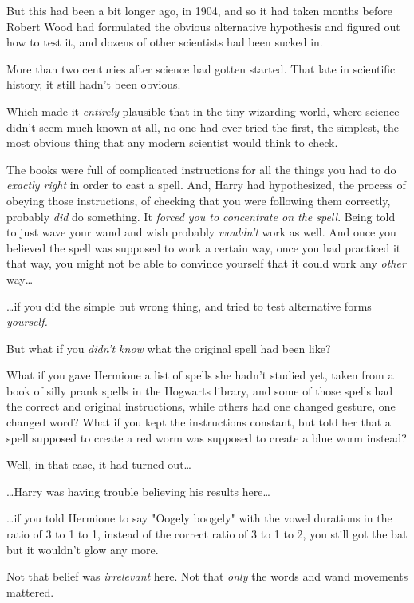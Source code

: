 But this had been a bit longer ago, in 1904, and so it had taken months before
Robert Wood had formulated the obvious alternative hypothesis and figured out
how to test it, and dozens of other scientists had been sucked in.

More than two centuries after science had gotten started. That late in
scientific history, it still hadn't been obvious.

Which made it \emph{entirely} plausible that in the tiny wizarding world, where
science didn't seem much known at all, no one had ever tried the first, the
simplest, the most obvious thing that any modern scientist would think to check.

The books were full of complicated instructions for all the things you had to
do \emph{exactly right} in order to cast a spell. And, Harry had hypothesized,
the process of obeying those instructions, of checking that you were following
them correctly, probably \emph{did} do something. It \emph{forced you to
concentrate on the spell}. Being told to just wave your wand and wish probably
\emph{wouldn't} work as well. And once you believed the spell was supposed to
work a certain way, once you had practiced it that way, you might not be able
to convince yourself that it could work any \emph{other} way{\ldots}

{\ldots}if you did the simple but wrong thing, and tried to test alternative
forms \emph{yourself.}

But what if you \emph{didn't know} what the original spell had been like?

What if you gave Hermione a list of spells she hadn't studied yet, taken from a
book of silly prank spells in the Hogwarts library, and some of those spells
had the correct and original instructions, while others had one changed
gesture, one changed word? What if you kept the instructions constant, but told
her that a spell supposed to create a red worm was supposed to create a blue
worm instead?

Well, in that case, it had turned out{\ldots}

{\ldots}Harry was having trouble believing his results here{\ldots}

{\ldots}if you told Hermione to say "Oogely boogely" with the vowel durations
in the ratio of 3 to 1 to 1, instead of the correct ratio of 3 to 1 to 2, you
still got the bat but it wouldn't glow any more.

Not that belief was \emph{irrelevant} here. Not that \emph{only} the words and
wand movements mattered.


